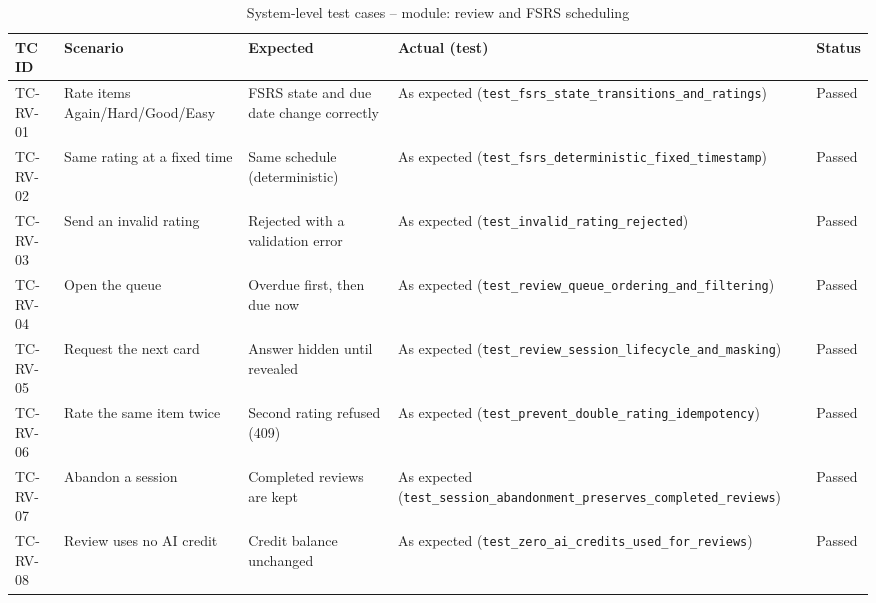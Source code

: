 \begin{table}[!htbp]
\centering
\caption{System-level test cases -- module: review and FSRS scheduling}\label{tab:tc_review}
\tcbody
\begin{tabularx}{\textwidth}{@{}l Y Y Y l@{}}
\toprule
\textbf{TC ID} & \textbf{Scenario} & \textbf{Expected} & \textbf{Actual (test)} & \textbf{Status}\\
\midrule
TC-RV-01 & Rate items Again/Hard/Good/Easy & FSRS state and due date change correctly & As expected (\texttt{test\_fsrs\_state\_transitions\_and\_ratings}) & Passed\\
TC-RV-02 & Same rating at a fixed time & Same schedule (deterministic) & As expected (\texttt{test\_fsrs\_deterministic\_fixed\_timestamp}) & Passed\\
TC-RV-03 & Send an invalid rating & Rejected with a validation error & As expected (\texttt{test\_invalid\_rating\_rejected}) & Passed\\
TC-RV-04 & Open the queue & Overdue first, then due now & As expected (\texttt{test\_review\_queue\_ordering\_and\_filtering}) & Passed\\
TC-RV-05 & Request the next card & Answer hidden until revealed & As expected (\texttt{test\_review\_session\_lifecycle\_and\_masking}) & Passed\\
TC-RV-06 & Rate the same item twice & Second rating refused (409) & As expected (\texttt{test\_prevent\_double\_rating\_idempotency}) & Passed\\
TC-RV-07 & Abandon a session & Completed reviews are kept & As expected (\texttt{test\_session\_abandonment\_preserves\_completed\_reviews}) & Passed\\
TC-RV-08 & Review uses no AI credit & Credit balance unchanged & As expected (\texttt{test\_zero\_ai\_credits\_used\_for\_reviews}) & Passed\\
\bottomrule
\end{tabularx}
\end{table}

